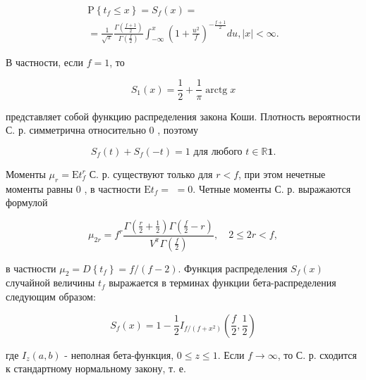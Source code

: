 \documentclass[10pt]{article}
\begin{document}
\[

\begin{gathered}

\mathrm{P}\left\{t_{f} \leqslant x\right\}=S_{f}(x)= \\

=\frac{1}{\sqrt{\pi}} \frac{\Gamma\left(\frac{f+1}{2}\right)}{\Gamma\left(\frac{f}{2}\right)} \int_{-\infty}^{x}\left(1+\frac{u^{2}}{f}\right)^{-\frac{f+1}{2}} d u,|x|<\infty .

\end{gathered}

\]



В частности, если $f=1$, то



\[

S_{1}(x)=\frac{1}{2}+\frac{1}{\pi} \operatorname{arctg} x

\]



представляет собой функцию распределения закона Коши. Плотность вероятности С. р. симметрична относительно 0 , поэтому



\[

S_{f}(t)+S_{f}(-t)=1 \text { для любого } t \in \mathbb{R} \mathbf{1} .

\]



Моменты $\mu_{r}=\mathrm{E} t_{f}^{r}$ С. р. существуют только для $r<f$, при этом нечетные моменты равны 0 , в частности $\mathrm{E} t_{f}=$ $=0$. Четные моменты С. р. выражаются формулой



\[

\mu_{2 r}=f^{r} \frac{\Gamma\left(\frac{r}{2}+\frac{1}{2}\right) \Gamma\left(\frac{f}{2}-r\right)}{V^{\pi} \Gamma\left(\frac{f}{2}\right)}, \quad 2 \leqslant 2 r<f,

\]



в частности $\mu_{2}=D\left\{t_{f}\right\}=f /(f-2)$. Функция распределения $S_{f}(x)$ случайной величины $t_{f}$ выражается в терминах функции бета-распределения следующим образом:



\[

S_{f}(x)=1-\frac{1}{2} I_{f /\left(f+x^{2}\right)}\left(\frac{f}{2}, \frac{1}{2}\right)

\]



где $I_{z}(a, b)$ - неполная бета-функция, $0 \leqslant z \leqslant 1$. Если $f \rightarrow \infty$, то С. р. сходится к стандартному нормальному закону, т. е.
\end{document}
